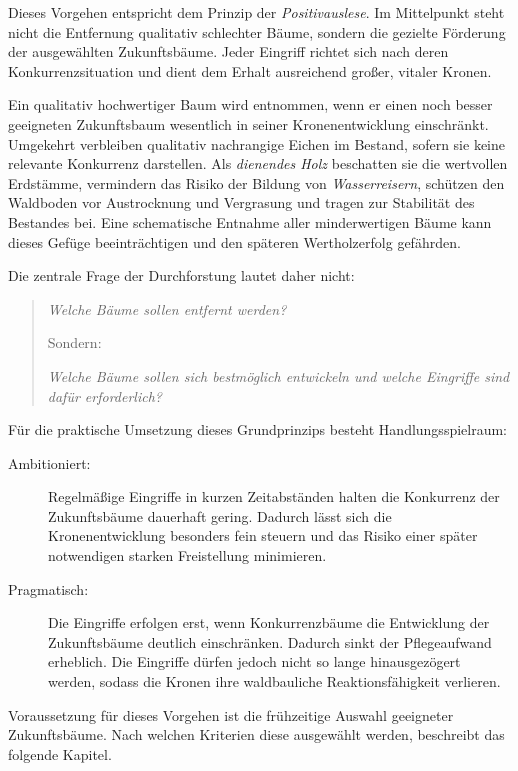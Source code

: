 \documentclass[twocolumn, bibliography=totoc, abstract=true]{scrartcl}
\begin{document}
Dieses Vorgehen entspricht dem Prinzip der \emph{Positivauslese}. Im Mittelpunkt steht nicht die Entfernung qualitativ schlechter Bäume, sondern die gezielte Förderung der ausgewählten Zukunftsbäume. Jeder Eingriff richtet sich nach deren Konkurrenzsituation und dient dem Erhalt ausreichend großer, vitaler Kronen.

Ein qualitativ hochwertiger Baum wird entnommen, wenn er einen noch besser geeigneten Zukunftsbaum wesentlich in seiner Kronenentwicklung einschränkt. Umgekehrt verbleiben qualitativ nachrangige Eichen im Bestand, sofern sie keine relevante Konkurrenz darstellen. Als \emph{dienendes Holz} beschatten sie die wertvollen Erdstämme, vermindern das Risiko der Bildung von \emph{Wasserreisern}, schützen den Waldboden vor Austrocknung und Vergrasung und tragen zur Stabilität des Bestandes bei. Eine schematische Entnahme aller minderwertigen Bäume kann dieses Gefüge beeinträchtigen und den späteren Wertholzerfolg gefährden.

Die zentrale Frage der Durchforstung lautet daher nicht:

\begin{quote}
\emph{Welche Bäume sollen entfernt werden?}

Sondern:

\emph{Welche Bäume sollen sich bestmöglich entwickeln und welche Eingriffe sind dafür erforderlich?}
\end{quote}

Für die praktische Umsetzung dieses Grundprinzips besteht Handlungsspielraum:

\begin{description}
\item[Ambitioniert:] Regelmäßige Eingriffe in kurzen Zeitabständen halten die Konkurrenz der Zukunftsbäume dauerhaft gering. Dadurch lässt sich die Kronenentwicklung besonders fein steuern und das Risiko einer später notwendigen starken Freistellung minimieren.
\item[Pragmatisch:] Die Eingriffe erfolgen erst, wenn Konkurrenzbäume die Entwicklung der Zukunftsbäume deutlich einschränken. Dadurch sinkt der Pflegeaufwand erheblich. Die Eingriffe dürfen jedoch nicht so lange hinausgezögert werden, sodass die Kronen ihre waldbauliche Reaktionsfähigkeit verlieren.
\end{description}

Voraussetzung für dieses Vorgehen ist die frühzeitige Auswahl geeigneter Zukunftsbäume. Nach welchen Kriterien diese ausgewählt werden, beschreibt das folgende Kapitel.
\end{document}
